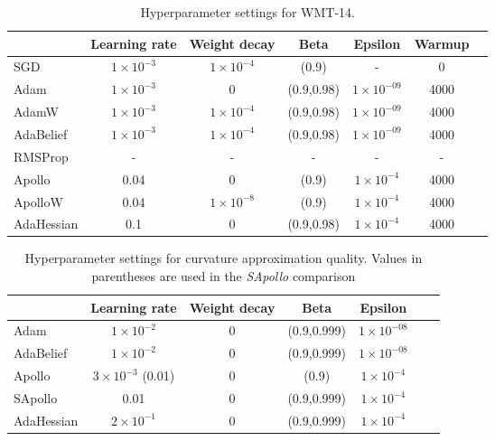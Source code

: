 \begin{table}[h!]
    \centering
    \caption{Hyperparameter settings for WMT-14.}
    \label{tab:wmt14-params}
    \begin{tabular}{lcccccc}  %
        \toprule
        & \textbf{Learning rate} & \textbf{Weight decay} & \textbf{Beta} & \textbf{Epsilon} & \textbf{Warmup}  \\
        \midrule
        SGD         & $1 \times 10^{-3}$ & $1 \times 10 ^{-4} $ & (0.9) & - & 0  \\
        Adam        & $1 \times 10^{-3}$ & 0  & (0.9,0.98) & $1 \times 10^{-09}$ & 4000     \\
        AdamW        & $1 \times 10^{-3}$ & $1 \times 10 ^{-4}$  & (0.9,0.98) & $1 \times 10^{-09}$ & 4000 \\
        AdaBelief   & $1 \times 10^{-3}$ & $1 \times 10 ^{-4}$   & (0.9,0.98) & $1 \times 10^{-09}$ & 4000  \\
        RMSProp     & - & - & - & -& - \\
        Apollo      & 0.04  & 0  & (0.9) & $1 \times 10 ^{-4} $ & 4000  \\
        ApolloW     & 0.04  & $1 \times 10^{-8}$  & (0.9) & $1 \times 10 ^{-4} $ & 4000  \\
        AdaHessian  & 0.1 & 0  & (0.9,0.98) &$1 \times 10 ^{-4} $& 4000 \\
        \bottomrule
    \end{tabular}
\end{table}

\begin{table}[h!]
    \centering
    \caption{Hyperparameter settings for curvature approximation quality. Values in parentheses are used in the \emph{SApollo} comparison}
    \label{tab:curve-approx-params}
    \begin{tabular}{lcccccc}  %
        \toprule
        & \textbf{Learning rate} & \textbf{Weight decay} & \textbf{Beta} & \textbf{Epsilon} \\
        \midrule
        Adam        & $1 \times 10^{-2}$ & 0  & (0.9,0.999) & $1 \times 10^{-08}$   \\
        AdaBelief   & $1 \times 10^{-2}$ & 0   & (0.9,0.999) & $1 \times 10^{-08}$   \\
        Apollo      & $3 \times 10^{-3}$ (0.01)  & 0  & (0.9)  & $1 \times 10 ^{-4} $  \\
        SApollo      & 0.01 & 0  & (0.9,0.999)  & $1 \times 10 ^{-4} $  \\

        AdaHessian  & $2 \times 10^{-1}$ & 0  & (0.9,0.999) &   $1 \times 10 ^{-4} $ \\
        \bottomrule
    \end{tabular}
\end{table}


